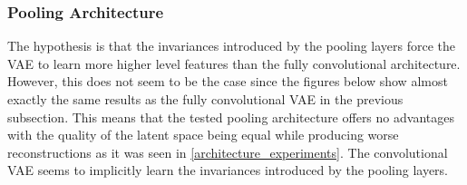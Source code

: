 \subsubsection{Pooling Architecture}

The hypothesis is that the invariances introduced by the pooling layers force the VAE to learn more higher level
features than the fully convolutional architecture. However, this does not seem to be the case since the 
figures below show almost exactly the same results as the fully convolutional
VAE in the previous subsection. This means that the tested pooling architecture offers no advantages with the
quality of the latent space being equal while producing worse reconstructions as it was seen in 
\autoref{architecture_experiments}. The convolutional VAE seems to implicitly learn the invariances introduced by
the pooling layers.


